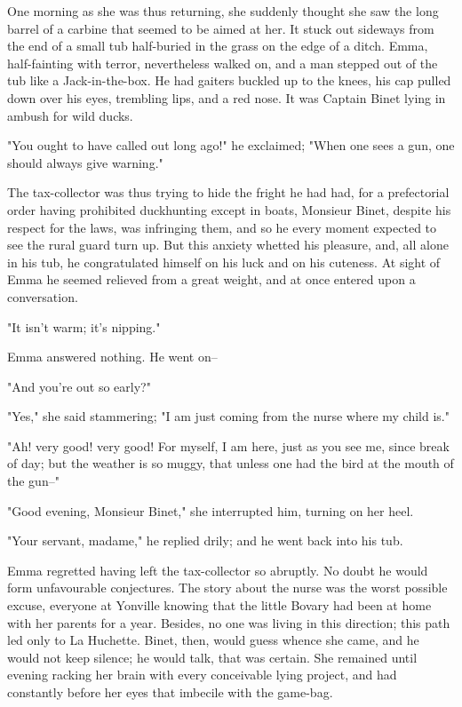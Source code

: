 \documentclass[11pt,twocolumn]{ltugboat}
\begin{document}
One morning as she was thus returning, she suddenly thought she saw the
long barrel of a carbine that seemed to be aimed at her. It stuck out
sideways from the end of a small tub half-buried in the grass on the
edge of a ditch. Emma, half-fainting with terror, nevertheless walked
on, and a man stepped out of the tub like a Jack-in-the-box. He had
gaiters buckled up to the knees, his cap pulled down over his eyes,
trembling lips, and a red nose. It was Captain Binet lying in ambush for
wild ducks.

"You ought to have called out long ago!" he exclaimed; "When one sees a
gun, one should always give warning."

The tax-collector was thus trying to hide the fright he had had, for
a prefectorial order having prohibited duckhunting except in boats,
Monsieur Binet, despite his respect for the laws, was infringing them,
and so he every moment expected to see the rural guard turn up. But
this anxiety whetted his pleasure, and, all alone in his tub, he
congratulated himself on his luck and on his cuteness. At sight of
Emma he seemed relieved from a great weight, and at once entered upon a
conversation.

"It isn't warm; it's nipping."

Emma answered nothing. He went on--

"And you're out so early?"

"Yes," she said stammering; "I am just coming from the nurse where my
child is."

"Ah! very good! very good! For myself, I am here, just as you see me,
since break of day; but the weather is so muggy, that unless one had the
bird at the mouth of the gun--"

"Good evening, Monsieur Binet," she interrupted him, turning on her
heel.

"Your servant, madame," he replied drily; and he went back into his tub.

Emma regretted having left the tax-collector so abruptly. No doubt he
would form unfavourable conjectures. The story about the nurse was the
worst possible excuse, everyone at Yonville knowing that the little
Bovary had been at home with her parents for a year. Besides, no one
was living in this direction; this path led only to La Huchette. Binet,
then, would guess whence she came, and he would not keep silence; he
would talk, that was certain. She remained until evening racking her
brain with every conceivable lying project, and had constantly before
her eyes that imbecile with the game-bag.
\end{document}
